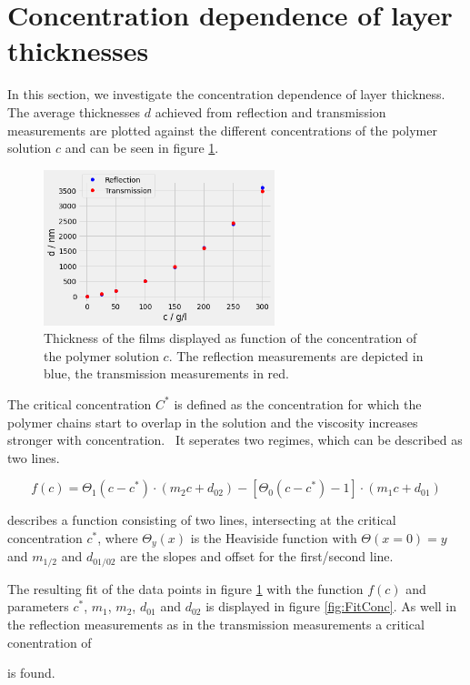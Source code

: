 \section{Concentration dependence of layer thicknesses}
\label{sec:rot}

In this section, we investigate the concentration dependence of layer thickness. The average thicknesses $d$ achieved from reflection and transmission measurements are plotted against the different concentrations of the polymer solution $c$ and can be seen in figure \ref{fig:ConcReflTrans}.


\begin{figure}[ht]
    \centering
    \includegraphics[width = 0.6\textwidth]{Bilder/Auswertung/Concentration/PlotReflTrans.png}
    \caption{Thickness of the films displayed as function of the concentration of the polymer solution $c$. The reflection measurements are depicted in blue, the transmission measurements in red.}
    \label{fig:ConcReflTrans}
\end{figure}

The critical concentration $C^*$ is defined as the concentration for which the polymer chains start to overlap in the solution and the viscosity increases stronger with concentration.~\cite{Ruderer.2009} It seperates two regimes, which can be described as two lines.

\begin{equation}
    f(c) = \Theta_1(c - c^*) \cdot (m_2c + d_{02}) - [\Theta_0(c - c^*)-1] \cdot (m_1c+d_{01})
    \label{eq:twoLines}
\end{equation}

describes a function consisting of two lines, intersecting at the critical concentration $c^*$, where $\Theta_y(x)$ is the Heaviside function with $\Theta(x=0)=y$ and $m_{1/2}$ and $d_{01/02}$ are the slopes and offset for the first/second line. \par 

The resulting fit of the data points in figure \ref{fig:ConcReflTrans} with the function $f(c)$ and parameters $c^*$, $m_1$, $m_2$, $d_{01}$ and $d_{02}$ is displayed in figure \ref{fig:FitConc}. As well in the reflection measurements as in the transmission measurements a critical conentration of \par 
\centerline{} \par 
is found.

